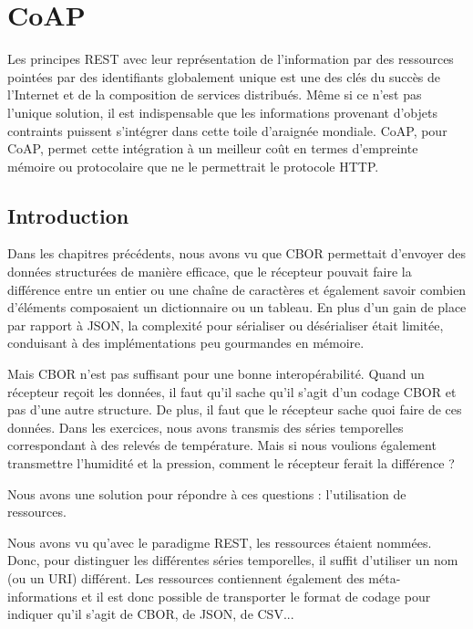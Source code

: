 \cleardoublepage
\chapter{CoAP}

Les principes \ac{REST} avec leur représentation de l'information par des ressources pointées par des identifiants globalement unique est une des clés du succès de l'Internet et de la composition de services distribués. Même si ce n'est pas l'unique solution, il est indispensable que les informations provenant d'objets contraints puissent s'intégrer dans cette toile d'araignée mondiale. \acs{CoAP}, pour \acl{CoAP}, permet cette intégration à un meilleur coût en termes d'empreinte mémoire ou protocolaire que ne le permettrait le protocole \ac{HTTP}.

\section{Introduction}

Dans les chapitres précédents, nous avons vu que \ac{CBOR} permettait d’envoyer des données structurées de manière efficace, que le récepteur pouvait faire la différence entre un entier ou une chaîne de caractères et également savoir combien d’éléments composaient un dictionnaire ou un tableau. En plus d’un gain de place par rapport à \ac{JSON}, la complexité pour sérialiser ou désérialiser était limitée, conduisant à des implémentations peu gourmandes en mémoire.

         \vspace{1em}


Mais CBOR n’est pas suffisant pour une bonne interopérabilité. Quand un récepteur reçoit les données, il faut qu'il sache qu’il s’agit d’un codage CBOR et pas d'une autre structure. De plus, il faut que le récepteur sache quoi faire de ces données. Dans les exercices, nous avons transmis des séries temporelles correspondant à des relevés de température. Mais si nous voulions également transmettre l’humidité et la pression, comment le récepteur ferait la différence ?

         \vspace{1em}

Nous avons une solution pour répondre à ces questions : l’utilisation de ressources.

         \vspace{1em}

Nous avons vu qu’avec le paradigme REST, les ressources étaient nommées. Donc, pour distinguer les différentes séries temporelles, il suffit d’utiliser un nom (ou un URI) différent. Les ressources contiennent également des méta-informations et il est donc possible de transporter le format de codage pour indiquer qu’il s’agit de \ac{CBOR}, de \ac{JSON}, de \ac{CSV}...


